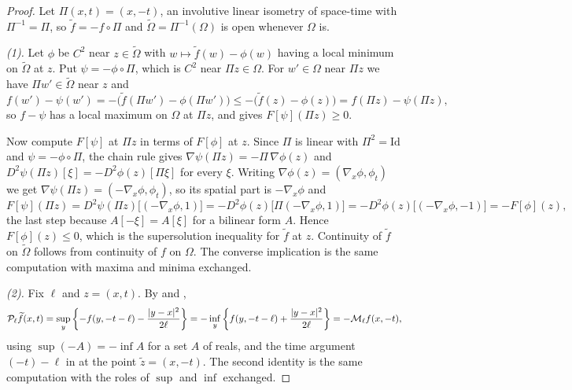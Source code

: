 \begin{proof}
Let $\Pi(x,t)=(x,-t)$, an involutive linear isometry of space-time with
$\Pi^{-1}=\Pi$, so $\widetilde f=-f\circ\Pi$ and
$\widetilde\Omega=\Pi^{-1}(\Omega)$ is open whenever $\Omega$ is.

\emph{(1).} Let $\phi$ be $C^2$ near $z\in\widetilde\Omega$ with
$w\mapsto\widetilde f(w)-\phi(w)$ having a local minimum on $\widetilde\Omega$ at
$z$. Put $\psi=-\phi\circ\Pi$, which is $C^2$ near $\Pi z\in\Omega$. For
$w'\in\Omega$ near $\Pi z$ we have $\Pi w'\in\widetilde\Omega$ near $z$ and
\[
  f(w')-\psi(w')=-\bigl(\widetilde f(\Pi w')-\phi(\Pi w')\bigr)
    \le-\bigl(\widetilde f(z)-\phi(z)\bigr)=f(\Pi z)-\psi(\Pi z),
\]
so $f-\psi$ has a local maximum on $\Omega$ at $\Pi z$, and
 gives $F[\psi](\Pi z)\ge0$.

Now compute $F[\psi]$ at $\Pi z$ in terms of $F[\phi]$ at $z$. Since $\Pi$ is
linear with $\Pi^2=\mathrm{Id}$ and $\psi=-\phi\circ\Pi$, the chain rule gives
$\nabla\psi(\Pi z)=-\Pi\,\nabla\phi(z)$ and
$D^2\psi(\Pi z)[\xi]=-D^2\phi(z)[\Pi\xi]$ for every $\xi$. Writing
$\nabla\phi(z)=(\nabla_x\phi,\phi_t)$ we get
$\nabla\psi(\Pi z)=(-\nabla_x\phi,\phi_t)$, so its spatial part is
$-\nabla_x\phi$ and
\[
  F[\psi](\Pi z)=D^2\psi(\Pi z)\bigl[(-\nabla_x\phi,1)\bigr]
   =-D^2\phi(z)\bigl[\Pi(-\nabla_x\phi,1)\bigr]
   =-D^2\phi(z)\bigl[(-\nabla_x\phi,-1)\bigr]
   =-F[\phi](z),
\]
the last step because $A[-\xi]=A[\xi]$ for a bilinear form $A$. Hence
$F[\phi](z)\le0$, which is the supersolution inequality for $\widetilde f$ at
$z$. Continuity of $\widetilde f$ on $\widetilde\Omega$ follows from continuity
of $f$ on $\Omega$. The converse implication is the same computation with maxima
and minima exchanged.

\emph{(2).} Fix $\ell$ and $z=(x,t)$. By  and
,
\[
  \mathcal{P}_\ell\widetilde f(x,t)
   =\sup_y\left\{-f(y,-t-\ell)-\frac{|y-x|^2}{2\ell}\right\}
   =-\inf_y\left\{f(y,-t-\ell)+\frac{|y-x|^2}{2\ell}\right\}
   =-\mathcal{M}_\ell f(x,-t),
\]
using $\sup(-A)=-\inf A$ for a set $A$ of reals, and the time argument
$(-t)-\ell$ in  at the point $\widetilde z=(x,-t)$. The second
identity is the same computation with the roles of $\sup$ and $\inf$ exchanged.


\end{proof}
